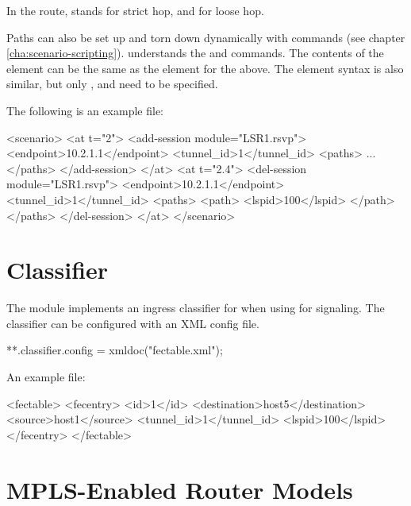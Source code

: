 In the route,  stands for strict hop, and  for loose hop.

Paths can also be set up and torn down dynamically with  
commands (see chapter \ref{cha:scenario-scripting}). 
 understands the  and 
 commands. The contents of the 
element can be the same as the  element for the 
above. The  element syntax is also similar, but only
,  and  need to be specified.

The following is an example  file:

\begin{XML}
<scenario>
    <at t="2">
        <add-session module="LSR1.rsvp">
            <endpoint>10.2.1.1</endpoint>
            <tunnel_id>1</tunnel_id>
            <paths>
                ...
            </paths>
        </add-session>
    </at>
    <at t="2.4">
        <del-session module="LSR1.rsvp">
            <endpoint>10.2.1.1</endpoint>
            <tunnel_id>1</tunnel_id>
            <paths>
                <path>
                    <lspid>100</lspid>
                </path>
            </paths>
        </del-session>
    </at>
</scenario>
\end{XML}

\section{Classifier}

The  module implements an ingress classifier for
 when using  for signaling. The classifier can be
configured with an XML config file.

\begin{inifile}
**.classifier.config = xmldoc("fectable.xml");
\end{inifile}

An example  file:

\begin{XML}
<fectable>
    <fecentry>
        <id>1</id>
        <destination>host5</destination>
        <source>host1</source>
        <tunnel_id>1</tunnel_id>
        <lspid>100</lspid>
    </fecentry>
</fectable>
\end{XML}
\section{MPLS-Enabled Router Models}

